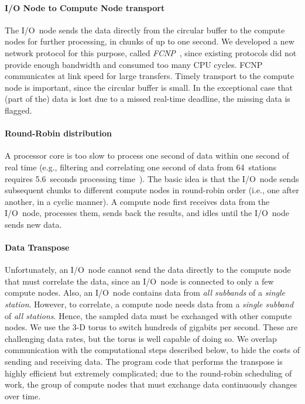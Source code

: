 \paragraph{I/O Node to Compute Node transport }
The I/O~node sends the data directly from the circular buffer to the compute
nodes for further processing, in chunks of up to one second.
We developed a new network protocol for this purpose, called
\emph{FCNP\/}~\cite{Romein:09a}, since existing protocols did not provide
enough bandwidth and consumed too many CPU cycles.
FCNP communicates at link speed for large transfers.
Timely transport to the compute node is important, since the circular buffer
is small.
In the exceptional case that (part of the) data is lost due to a missed
real-time deadline, the missing data is flagged.


\paragraph{Round-Robin distribution}
A processor core is too slow to process one second of data within one second of
real time (e.g., filtering and correlating one second of data from 64~stations
requires 5.6~seconds processing time~\cite{Romein:10a}).
The basic idea is that the I/O~node sends subsequent chunks to different
compute nodes in round-robin order (i.e., one after another, in a cyclic
manner).
A compute node first receives data from the I/O~node, processes them, sends
back the results, and idles until the I/O~node sends new data.


\paragraph{Data Transpose }
Unfortunately, an I/O~node cannot send the data directly to the compute node
that must correlate the data, since an I/O~node is connected to only a few
compute nodes.
Also, an I/O~node contains data from \emph{all subbands\/} of a \emph{single
station}.
However, to correlate, a compute node needs data from a \emph{single subband\/}
of \emph{all stations}.
Hence, the sampled data must be exchanged with other compute nodes.
We use the 3-D torus to switch hundreds of gigabits per second.
These are challenging data rates, but the torus is well capable of doing so.
We overlap communication with the computational steps described below,
to hide the costs of sending and receiving data.
The program code that performs the transpose is highly efficient but extremely
complicated; due to the round-robin scheduling of work, the group of compute
nodes that must exchange data continuously changes over time.


